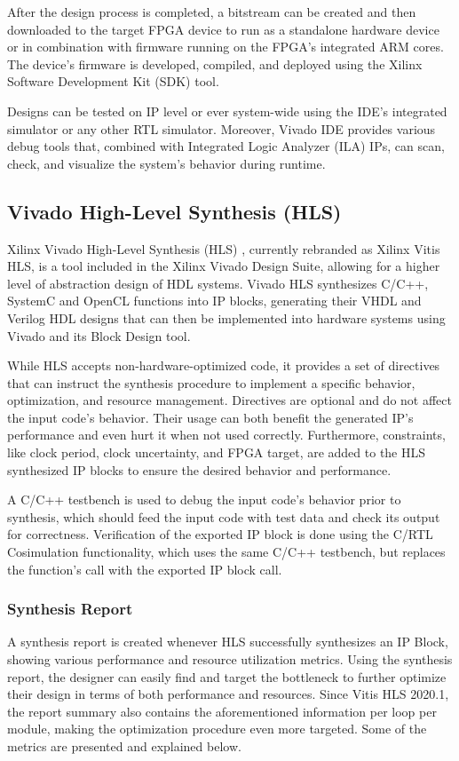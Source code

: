 After the design process is completed, a bitstream can be created and then downloaded to the target FPGA device to run as a standalone hardware device or in combination with firmware running on the FPGA's integrated ARM cores. The device's firmware is developed, compiled, and deployed using the Xilinx Software Development Kit (SDK) tool.

Designs can be tested on IP level or ever system-wide using the IDE's integrated simulator or any other RTL simulator. Moreover, Vivado IDE provides various debug tools that, combined with Integrated Logic Analyzer (ILA) IPs, can scan, check, and visualize the system's behavior during runtime.

\subsection{Vivado High-Level Synthesis (HLS)}
Xilinx Vivado High-Level Synthesis (HLS) \cite{Vivado-Design-Suite-User-Guide-High-Level-Synthesis}, currently rebranded as Xilinx Vitis HLS, is a tool included in the Xilinx Vivado Design Suite, allowing for a higher level of abstraction design of HDL systems. Vivado HLS synthesizes C/C++, SystemC and OpenCL functions into IP blocks, generating their VHDL and Verilog HDL designs that can then be implemented into hardware systems using Vivado and its Block Design tool.

While HLS accepts non-hardware-optimized code, it provides a set of directives that can instruct the synthesis procedure to implement a specific behavior, optimization, and resource management. Directives are optional and do not affect the input code's behavior. Their usage can both benefit the generated IP's performance and even hurt it when not used correctly. Furthermore, constraints, like clock period, clock uncertainty, and FPGA target, are added to the HLS synthesized IP blocks to ensure the desired behavior and performance.

A C/C++ testbench is used to debug the input code's behavior prior to synthesis, which should feed the input code with test data and check its output for correctness. Verification of the exported IP block is done using the C/RTL Cosimulation functionality, which uses the same C/C++ testbench, but replaces the function's call with the exported IP block call.

\subsubsection{Synthesis Report}
A synthesis report is created whenever HLS successfully synthesizes an IP Block, showing various performance and resource utilization metrics. Using the synthesis report, the designer can easily find and target the bottleneck to further optimize their design in terms of both performance and resources. Since Vitis HLS 2020.1, the report summary also contains the aforementioned information per loop per module, making the optimization procedure even more targeted. Some of the metrics are presented and explained below.

